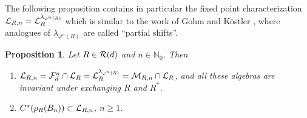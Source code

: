\documentclass[12pt,a4paper]{amsart}
\numberwithin{equation}{section}
\newtheorem{proposition}[theorem]{Proposition}
\theoremstyle{remark}
\newcommand{\Nl}{\mathbb{N}}
\newcommand{\la}{\lambda}
\newcommand{\CM}[0]{\mathcal{M}} \newcommand{\CN}[0]{\mathcal{N}}
\begin{document}
The following proposition contains in particular the fixed point characterization $\CL_{R,n}=\CL_R^{\la_{\varphi^n(R)}}$ which is similar to the work of Gohm and Köstler \cite{GohmKostler:2009_2}, where analogues of $\la_{\varphi^n(R)}$ are called ``partial shifts''.

\begin{proposition}\label{prop:LRn}
    Let $R\in\mathcal{R}(d)$ and $n\in\Nl_0$. Then 
    \begin{enumerate}
        \item\label{item:characterization-of-LRn} $\CL_{R,n}=\CF_d^n\cap\CL_R=\CL_R^{\la_{\varphi^n(R)}}=\CM_{R,n}\cap\CL_R$, and all these algebras are invariant under exchanging $R$ and $R^*$.
        \item\label{item:Bn-in-LRn} $C^*(\rho_R(B_n))\subset\mathcal{L}_{R,n}$, $n\geq1$.
    \end{enumerate}
\end{proposition}
\end{document}
